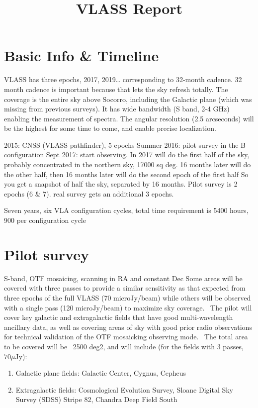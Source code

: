 \documentclass[12pt, letterpaper, preprint]{aastex}
\begin{document}
\title{VLASS Report}

\section{Basic Info \& Timeline}

VLASS has three epochs, 2017, 2019\dots
corresponding to 32-month cadence.
32 month cadence is important because that
lets the sky refresh totally.
The coverage is the entire sky above Socorro,
including the Galactic plane (which was missing
from previous surveys). 
It has wide bandwidth (S band, 2-4 GHz) enabling the
measurement of spectra.
The angular resolution (2.5 arcseconds) will be the highest
for some time to come, and enable precise localization.

2015: CNSS (VLASS pathfinder), 5 epochs
Summer 2016: pilot survey in the B configuration
Sept 2017: start observing.
In 2017 will do the first half of the sky,
probably concentrated in the northern sky, 17000 sq deg.
16 months later will do the other half,
then 16 months later will do the second epoch of the first half
So you get a snapshot of half the sky, separated by 16 months.
Pilot survey is 2 epochs (6 \& 7). real survey gets
an additional 3 epochs. 

Seven years, six VLA configuration cycles, total
time requirement is 5400 hours, 900 per configuration cycle

\section{Pilot survey}

S-band, OTF mosaicing, scanning in RA and constant Dec
Some areas will be covered with three passes to provide 
a similar sensitivity as that expected from three epochs 
of the full VLASS (70 microJy/beam) 
while others will be observed with a single pass (120 microJy/beam) 
to maximize sky coverage. 
The pilot will cover key galactic and extragalactic fields 
that have good multi-wavelength ancillary data, 
as well as covering areas of sky with good prior 
radio observations for technical validation of the OTF 
mosaicking observing mode. 
The total area to be covered will be ~2500 deg2, and will include
(for the fields with 3 passes, $70 \mu$Jy):

\begin{enumerate}
  \item Galactic plane fields: Galactic Center, Cygnus, Cepheus
  \item Extragalactic fields: Cosmological Evolution Survey, Sloane Digital Sky Survey (SDSS) Stripe 82, Chandra Deep Field South
\end{enumerate}
\end{document}
